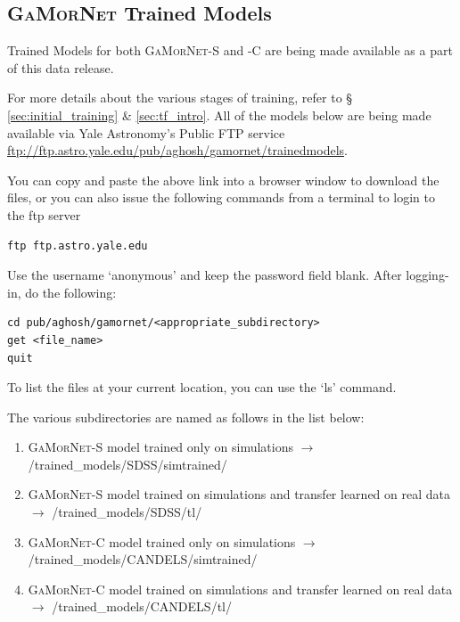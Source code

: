 \documentclass[twocolumn]{aastex63}
\newcommand\gamornet{G\textsc{a}M\textsc{or}N\textsc{et}}
\begin{document}
\subsection{\gamornet{} Trained Models }\label{sec:ap:gamornet_trained_models}

Trained Models for both \gamornet{}-S and -C are being made available as a part of this data release. 

For more details about the various stages of training, refer to \S\,\ref{sec:initial_training} \& \ref{sec:tf_intro}. All of the models below are being made available via Yale Astronomy's Public FTP service \href{ftp://ftp.astro.yale.edu/pub/aghosh/gamornet/trained_models}{ftp://ftp.astro.yale.edu/pub/aghosh/gamornet/trained\textunderscore models}. 

You can copy and paste the above link into a browser window to download the files, or you can also issue the following commands from a terminal to login to the ftp server

\begin{verbatim}
ftp ftp.astro.yale.edu
\end{verbatim}

Use the username `anonymous' and keep the password field blank. After logging-in, do the following:

\begin{verbatim}
cd pub/aghosh/gamornet/<appropriate_subdirectory> 
get <file_name>
quit
\end{verbatim}

To list the files at your current location, you can use the `ls' command. 

The various subdirectories are named as follows in the list below:

\begin{enumerate}
    \item \gamornet{}-S model trained only on simulations $\xrightarrow{}$ /trained\_models/SDSS/sim\textunderscore trained/
    \item \gamornet{}-S model trained on simulations and transfer learned on real data $\xrightarrow{}$ /trained\_models/SDSS/tl/
    \item \gamornet{}-C model trained only on simulations $\xrightarrow{}$ /trained\_models/CANDELS/sim\textunderscore trained/
    \item \gamornet{}-C model trained on simulations and transfer learned on real data $\xrightarrow{}$ /trained\_models/CANDELS/tl/
\end{enumerate}
\end{document}
